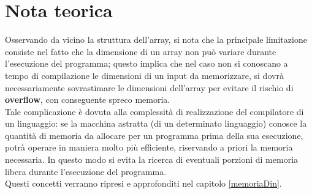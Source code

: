 \section{Nota teorica}
Osservando da vicino la struttura dell'array, si nota che la principale limitazione consiste nel fatto che la dimensione di un array non può variare durante l'esecuzione del programma; questo implica che nel caso non si conoscano a tempo di compilazione le dimensioni di un input da memorizzare, si dovrà necessariamente sovrastimare le dimensioni dell'array per evitare il rischio di \textbf{overflow}, con conseguente spreco memoria.\\ 
Tale complicazione è dovuta alla complessità di realizzazione del compilatore di un linguaggio: se la macchina astratta (di un determinato linguaggio) conosce la quantità di memoria da allocare per un programma prima della sua esecuzione, 
potrà operare in maniera molto più efficiente, riservando a priori la memoria necessaria. In questo modo si evita la ricerca di  eventuali porzioni di memoria libera durante l'esecuzione del programma.\\
Questi concetti verranno ripresi e approfonditi nel capitolo \ref{memoriaDin}.
